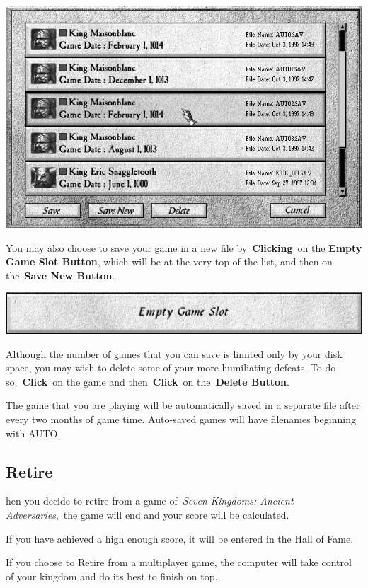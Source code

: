 \begin{center}
	\includegraphics[width=0.7\linewidth]{Isavegame}
\end{center}

You may also choose to save your game in a new file by \textbf{Clicking} on the \textbf{Empty Game Slot Button}, which will be at the very top of the list, and then on the \textbf{Save New Button}.

\begin{center}
	\includegraphics[width=0.7\linewidth]{Isavegame_emptyslot}
\end{center}

Although the number of games that you can save is limited only by your disk space, you may wish to delete some of your more humiliating defeats. To do so, \textbf{Click} on the game and then \textbf{Click} on the \textbf{Delete Button}.

The game that you are playing will be automatically saved in a separate file after every two months of game time. Auto-saved games will have filenames beginning with AUTO.

\subsection{Retire}

hen you decide to retire from a game of \textit{Seven Kingdoms: Ancient Adversaries}, the game will end and your score will be calculated.

If you have achieved a high enough score, it will be entered in the Hall of Fame.

If you choose to Retire from a multiplayer game, the computer will take control of your kingdom and do its best to finish on top.

